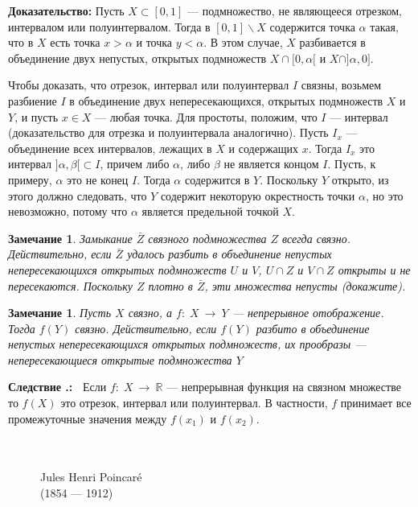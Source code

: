 \documentclass[12pt]{book}
\newcommand{\arrow}{{\:\longrightarrow\:}}
\def\endproof{\hbox{\vrule width 5pt height 5pt depth 0pt}}
\def\R{{\mathbb R}}
\theoremstyle{upshape}
\newtheorem{zadacha}{Задача}[chapter]
\theoremstyle{generic}
\newtheorem{remark}[teorema]{Замечание}
\def\замечание{\begin{remark}}
\def\еза{\end{remark}}
\theoremstyle{upshapenonumber}
\newcommand{\следствие}{%
     \refstepcounter{teorema}
     {\noindent\bf Следствие \thechapter.\arabic{teorema}:\ }}
\newcommand{\пример}{%
     \refstepcounter{teorema}
     {\noindent\bf Пример \thechapter.\arabic{teorema}:\ }}
\newcommand{\лемма}{%
     \refstepcounter{teorema}
     {\noindent\bf Лемма \thechapter.\arabic{teorema}:\ }}
\newcommand{\теорема}{%
     \refstepcounter{teorema}
     {\noindent\bf Теорема \thechapter.\arabic{teorema}:\ }}
\newcommand{\утверждение}{%
     \refstepcounter{teorema}
     {\noindent\bf Утверждение \thechapter.\arabic{teorema}:\ }}
\def\хфилл{\hfill}
\def\ноиндент{\noindent}
\def\бф{\bf}
\def\ем{\em}
\def\задача{\begin{zadacha}}
\def\ез{\end{zadacha}}
\def\еу{\end{ukazanie}}
\def\ео{\end{opredelenie}}
\def\енум{\begin{enumerate}}
\def\ее{\end{enumerate}}
\begin{document}
\хфилл

\ноиндент
{\бф Доказательство:} 
Пусть $X\subset [0,1]$ --- подмножество, не являющееся 
отрезком, интервалом или полуинтервалом.
Тогда в $[0, 1] \backslash X$ содержится 
точка $\alpha$ такая, что в $X$ есть точка
$x> \alpha$ и точка $y < \alpha$.
В этом случае, $X$ разбивается в объединение
двух непустых, открытых подмножеств
$X \cap [0, \alpha[$ и $X \cap ]\alpha, 0]$.

Чтобы доказать, что отрезок, интервал или
полуинтервал $I$ связны, возьмем разбиение $I$
в объединение двух непересекающихся, открытых подмножеств
$X$ и $Y$, и пусть $x\in X$ --- любая точка.
Для простоты, положим, что $I$ --- интервал
(доказательство для отрезка и полуинтервала аналогично).
Пусть $I_x$ --- объединение всех интервалов,
лежащих в $X$ и содержащих $x$. Тогда $I_x$
это интервал $]\alpha, \beta[\subset I$, 
причем либо $\alpha$, либо $\beta$
не является концом $I$. Пусть, к примеру,
$\alpha$ это не конец $I$. Тогда $\alpha$ 
содержится в $Y$. Поскольку $Y$ 
открыто, из этого должно следовать, что 
$Y$ содержит некоторую окрестность точки $\alpha$,
но это невозможно, потому что $\alpha$ является
предельной точкой $X$.
\endproof


\хфилл

\замечание
Замыкание $\bar Z$ связного подмножества $Z$ всегда связно.
Действительно, если $\bar Z$ удалось разбить в объединение
непустых непересекающихся открытых подмножеств $U$ и $V$,
$U \cap Z$ и $V\cap Z$ открыты и не
пересекаются. Поскольку $Z$ плотно в $\bar Z$, эти 
множества непусты (докажите).
\еза

\замечание
Пусть $X$ связно, а $f:\; X \arrow Y$ --- 
непрерывное отображение. Тогда $f(Y)$ связно.
Действительно, если $f(Y)$ разбито в объединение
непустых непересекающихся открытых подмножеств,
их прообразы --- непересекающиеся открытые подмножества $Y$
\еза

\следствие
Если $f:\; X \arrow \R$ --- непрерывная функция
на связном множестве то $f(X)$ это отрезок,
интервал или полуинтервал. В частности,
$f$ принимает все промежуточные значения
между $f(x_1)$ и $f(x_2)$. 


\begin{figure}[ht]
\begin{center}\ \\
\\
{Jules Henri Poincar\'e\\
(1854 --- 1912)}
\end{center}
\end{figure}
\end{document}
